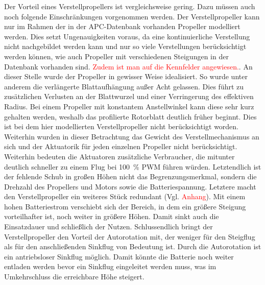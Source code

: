 




	Der Vorteil eines Verstellpropellers ist vergleichsweise gering. Dazu müssen auch noch folgende Einschränkungen vorgenommen werden. Der Verstellpropeller kann nur im Rahmen der in der APC-Datenbank vorhanden Propeller modelliert werden. Dies setzt Ungenauigkeiten voraus, da eine kontinuierliche Verstellung nicht nachgebildet werden kann und nur so viele Verstellungen berücksichtigt werden können, wie auch Propeller mit verschiedenen Steigungen in der Datenbank vorhanden sind. \textcolor{red}{Zudem ist man auf die Kennfelder angewiesen.}. An dieser Stelle wurde der Propeller in gewisser Weise idealisiert. So wurde unter anderem die verlängerte Blattaufhängung außer Acht gelassen. Dies führt zu zusätzlichen Verlusten an der Blattwurzel und einer Verringerung des effektiven Radius. Bei einem Propeller mit konstantem Anstellwinkel kann diese sehr kurz gehalten werden, weshalb das profilierte Rotorblatt deutlich früher beginnt. Dies ist bei dem hier modellierten Verstellpropeller nicht berücksichtigt worden.\\
Weiterhin wurden in dieser Betrachtung das Gewicht des Verstellmechanismus an sich und der Aktuatorik für jeden einzelnen Propeller nicht berücksichtigt. Weiterhin bedeuten die Aktuatoren zusätzliche Verbraucher, die mitunter deutlich schneller zu einem Flug bei \SI{100}{\%} PWM führen würden. Letztendlich ist der fehlende Schub in großen Höhen nicht das Begrenzungsmerkmal, sondern die Drehzahl des Propellers und Motors sowie die Batteriespannung. Letztere macht den Verstellpropeller ein weiteres Stück redundant (Vgl. \textcolor{red}{Anhang}). Mit einem hohen Batteriestrom verschiebt sich der Bereich, in dem ein größere Steigung vorteilhafter ist, noch weiter in größere Höhen. Damit sinkt auch die Einsatzdauer und schließlich der Nutzen. 
Schlussendlich bringt der Verstellpropeller den Vorteil der Autorotation mit, der weniger für den Steigflug als für den anschließenden Sinkflug von Bedeutung ist. Durch die Autorotation ist ein antriebsloser Sinkflug möglich. Damit könnte die Batterie noch weiter entladen werden bevor ein Sinkflug eingeleitet werden muss, was im Umkehrschluss die erreichbare Höhe steigert. 

